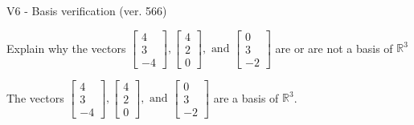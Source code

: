 \begin{exercise}
  \begin{exerciseTitle}V6 - Basis verification (ver. 566)\end{exerciseTitle}
  \begin{exerciseStatement}
    Explain why the vectors \(\left[\begin{array}{r}
4 \\
3 \\
-4
\end{array}\right] , \left[\begin{array}{r}
4 \\
2 \\
0
\end{array}\right] , \text{ and } \left[\begin{array}{r}
0 \\
3 \\
-2
\end{array}\right]\) are or are not a basis of \(\mathbb{R}^3\)	


  \end{exerciseStatement}
  \begin{exerciseAnswer}
   The vectors \(\left[\begin{array}{r}
4 \\
3 \\
-4
\end{array}\right] , \left[\begin{array}{r}
4 \\
2 \\
0
\end{array}\right] , \text{ and } \left[\begin{array}{r}
0 \\
3 \\
-2
\end{array}\right]\) 
  	 are  a basis of \(\mathbb{R}^3\).
  


  \end{exerciseAnswer}
\end{exercise}